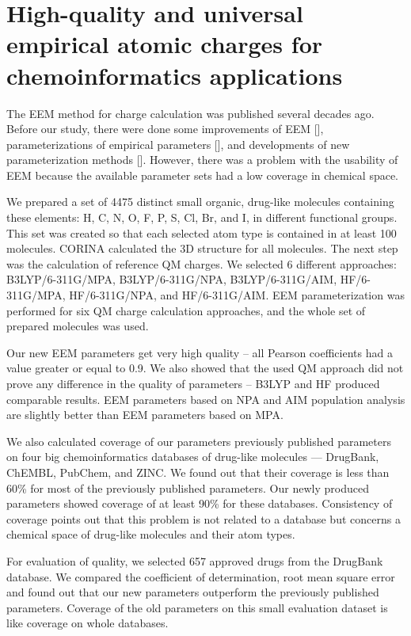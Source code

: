 \section{High-quality and universal empirical atomic charges for
chemoinformatics applications} \label{sec:param-article}

The EEM method for charge calculation was published several decades ago.
Before our study, there were done some improvements of EEM [], parameterizations
of empirical parameters [], and developments of new parameterization methods [].
However, there was a problem with the usability of EEM because the available
parameter sets had a low coverage in chemical space.    

We prepared a set of 4475 distinct small organic, drug-like molecules containing
these elements: H, C, N, O, F, P, S, Cl, Br, and I, in different functional
groups. This set was created so that each selected atom type is contained
in at least 100 molecules. CORINA calculated the 3D structure for all molecules.
The next step was the calculation of reference QM charges. We selected
6 different approaches: B3LYP/6-311G/MPA, B3LYP/6-311G/NPA, B3LYP/6-311G/AIM,
HF/6-311G/MPA, HF/6-311G/NPA, and HF/6-311G/AIM. EEM parameterization was
performed for six QM charge calculation approaches, and the whole
set of prepared molecules was used.

Our new EEM parameters get very high quality -- all Pearson coefficients had
a value greater or equal to 0.9. We also showed that the used QM approach did
not prove any difference in the quality of parameters -- B3LYP and HF produced
comparable results. EEM parameters based on NPA and AIM population analysis are
slightly better than EEM parameters based on MPA.

 We also calculated coverage of our parameters previously published parameters
 on four big chemoinformatics databases of drug-like molecules — DrugBank,
 ChEMBL, PubChem, and ZINC. We found out that their coverage is less than 60\%
 for most of the previously published parameters.  Our newly produced parameters
 showed coverage of at least 90\% for these databases. Consistency of coverage
 points out that this problem is not related to a database but concerns
 a chemical space of drug-like molecules and their atom types.

For evaluation of quality, we selected 657 approved drugs from the DrugBank
database. We compared the coefficient of determination, root mean square error
and found out that our new parameters outperform the previously published
parameters. Coverage of the old parameters on this small evaluation dataset
is like coverage on whole databases.

